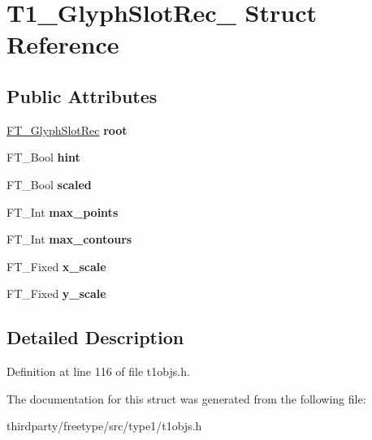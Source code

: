 \hypertarget{struct_t1___glyph_slot_rec__}{}\section{T1\+\_\+\+Glyph\+Slot\+Rec\+\_\+ Struct Reference}
\label{struct_t1___glyph_slot_rec__}
\subsection*{Public Attributes}
\begin{DoxyCompactItemize}
\item 
\mbox{\label{struct_t1___glyph_slot_rec___a84db71b78eef89959790a346f1ada9f1}} 
\hyperlink{struct_f_t___glyph_slot_rec__}{F\+T\+\_\+\+Glyph\+Slot\+Rec} {\bfseries root}
\item 
\mbox{\label{struct_t1___glyph_slot_rec___ab4777ab7bd1140891750de33f3ef3d7e}} 
F\+T\+\_\+\+Bool {\bfseries hint}
\item 
\mbox{\label{struct_t1___glyph_slot_rec___a6a253116dcea54d63d69ee2701a2014d}} 
F\+T\+\_\+\+Bool {\bfseries scaled}
\item 
\mbox{\label{struct_t1___glyph_slot_rec___acbe78d73b1aeac251467c0bfbbb087db}} 
F\+T\+\_\+\+Int {\bfseries max\+\_\+points}
\item 
\mbox{\label{struct_t1___glyph_slot_rec___ad8c8b84acdb97f293c7fda875b428589}} 
F\+T\+\_\+\+Int {\bfseries max\+\_\+contours}
\item 
\mbox{\label{struct_t1___glyph_slot_rec___af1b4c8fa0acced4743d667779db082a7}} 
F\+T\+\_\+\+Fixed {\bfseries x\+\_\+scale}
\item 
\mbox{\label{struct_t1___glyph_slot_rec___aff4e17984b008b51d4109fe980b0ea6a}} 
F\+T\+\_\+\+Fixed {\bfseries y\+\_\+scale}
\end{DoxyCompactItemize}


\subsection{Detailed Description}


Definition at line 116 of file t1objs.\+h.



The documentation for this struct was generated from the following file\+:\begin{DoxyCompactItemize}
\item 
thirdparty/freetype/src/type1/t1objs.\+h\end{DoxyCompactItemize}
